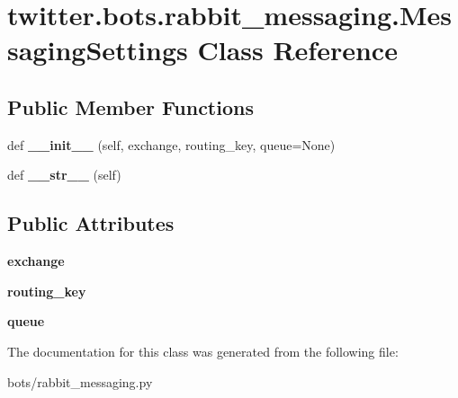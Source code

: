 \hypertarget{classtwitter_1_1bots_1_1rabbit__messaging_1_1MessagingSettings}{}\section{twitter.\+bots.\+rabbit\+\_\+messaging.\+Messaging\+Settings Class Reference}
\label{classtwitter_1_1bots_1_1rabbit__messaging_1_1MessagingSettings}
\subsection*{Public Member Functions}
\begin{DoxyCompactItemize}
\item 
\mbox{\label{classtwitter_1_1bots_1_1rabbit__messaging_1_1MessagingSettings_aab02d3dd7fcb1ce90bdad005eea1ad03}} 
def {\bfseries \+\_\+\+\_\+init\+\_\+\+\_\+} (self, exchange, routing\+\_\+key, queue=None)
\item 
\mbox{\label{classtwitter_1_1bots_1_1rabbit__messaging_1_1MessagingSettings_a30879baea8ee9148f80be7e3176af734}} 
def {\bfseries \+\_\+\+\_\+str\+\_\+\+\_\+} (self)
\end{DoxyCompactItemize}
\subsection*{Public Attributes}
\begin{DoxyCompactItemize}
\item 
\mbox{\label{classtwitter_1_1bots_1_1rabbit__messaging_1_1MessagingSettings_a6d11f8ce4ea05f1309edbead3eb0f9fb}} 
{\bfseries exchange}
\item 
\mbox{\label{classtwitter_1_1bots_1_1rabbit__messaging_1_1MessagingSettings_a352277abd0a4593c8d7ba67e0ddd0b24}} 
{\bfseries routing\+\_\+key}
\item 
\mbox{\label{classtwitter_1_1bots_1_1rabbit__messaging_1_1MessagingSettings_a2b192d87a0cabd664183d20295297c5a}} 
{\bfseries queue}
\end{DoxyCompactItemize}


The documentation for this class was generated from the following file\+:\begin{DoxyCompactItemize}
\item 
bots/rabbit\+\_\+messaging.\+py\end{DoxyCompactItemize}
